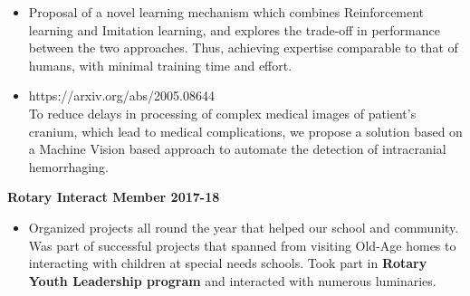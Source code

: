 \begin{itemize}
\item Proposal of a novel learning mechanism which combines Reinforcement learning and Imitation learning, and explores the trade-off in performance between the two approaches. Thus, achieving expertise comparable to that of humans, with minimal training time and effort.
\end{itemize}
\begin{itemize}
\item https://arxiv.org/abs/2005.08644 
\\To reduce delays in processing of complex medical images of patient's cranium, which lead to medical complications, we propose a solution based on a Machine Vision based approach to automate the detection of intracranial hemorrhaging.  
\end{itemize}
\smallskip
\begin{comment}
\cvproject{Portable Air Conditioner (09/2015 - 12/2015)}
\begin{itemize}
\item An Innovative approach to affordable air conditioning for user who cannot afford an A/C or the electricity costs, where the which targets the specific use of an A/C that is while sleeping, by cooling only the bed and its surroundings. A prototype for which was also made. Presented at CBSE Science Exhibition, state level on 17-19 Dec 2015.
\end{itemize}
\end{comment}

 


\large{\textbf{Rotary Interact Member 2017-18}}
\begin{itemize}
\item[\faTrophy]Organized projects all round the year that helped our school and community. Was part of successful projects that spanned from visiting Old-Age homes to interacting with children at special needs schools. Took part in \textbf{Rotary Youth Leadership program} and interacted with numerous luminaries.
\end{itemize}
